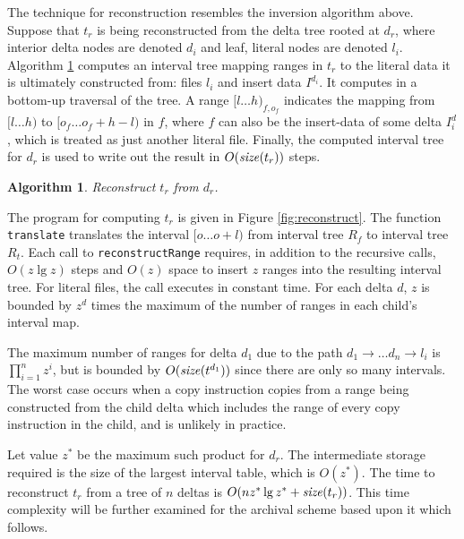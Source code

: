 \documentclass{llncs}
\newtheorem{alg}{{\sc Algorithm}}
\begin{document}
The technique for reconstruction resembles the inversion algorithm
above.  Suppose that $t_r$ is being reconstructed from the delta tree
rooted at $d_r$, where interior delta nodes are denoted $d_i$ and
leaf, literal nodes are denoted $l_i$.  Algorithm
\ref{alg:reconstruct} computes an interval tree mapping ranges in
$t_r$ to the literal data it is ultimately constructed from: files
$l_i$ and insert data $I^{d_i}$.  It computes in a bottom-up traversal
of the tree.  A range $[l \ldots h)_{f,o_f}$ indicates the mapping
from $[l \ldots h)$ to $[o_f \ldots o_f + h - l)$ in $f$, where $f$
can also be the insert-data of some delta $I^d_i$, which is treated as
just another literal file.  Finally, the computed interval tree for
$d_r$ is used to write out the result in $O(\textrm{\emph{size}}(t_r))$ steps.

\begin{alg}\label{alg:reconstruct}
Reconstruct $t_r$ from $d_r$.
\end{alg}

The program for computing $t_r$ is given in Figure
\ref{fig:reconstruct}.  The function \texttt{translate} translates the
interval $[o \ldots o + l)$ from interval tree $R_f$ to interval tree
$R_t$.  Each call to \texttt{reconstructRange} requires, in addition
to the recursive calls, $O(z \lg z)$ steps and $O(z)$ space to insert
$z$ ranges into the resulting interval tree.  For literal files, the
call executes in constant time.  For each delta $d$, $z$ is bounded by
$z^d$ times the maximum of the number of ranges in each child's
interval map.

The maximum number of ranges for delta $d_1$ due to the path $d_1
\rightarrow \ldots d_n \rightarrow l_i$ is $\prod_{i=1}^{n}{z^i}$, but
is bounded by $O(\textrm{\emph{size}}(t^{d_1}))$ since there are only so many
intervals.  The worst case occurs when a copy instruction copies from
a range being constructed from the child delta which includes the
range of every copy instruction in the child, and is unlikely in
practice.

Let value $z^*$ be the maximum such product for $d_r$.  The
intermediate storage required is the size of the largest interval
table, which is $O(z^*)$.  The time to reconstruct $t_r$ from a tree
of $n$ deltas is $O(n z^* \lg z^* + \textrm{\emph{size}}(t_r))$.  This time
complexity will be further examined for the archival scheme based upon
it which follows.
\end{document}
